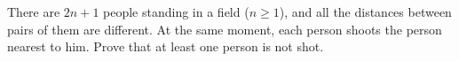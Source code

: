 There are $2n+1$ people standing in a field ($n\ge1$), and all the distances between pairs of them are different. At the same moment, each person shoots the person nearest to him. Prove that at least one person is not shot.
